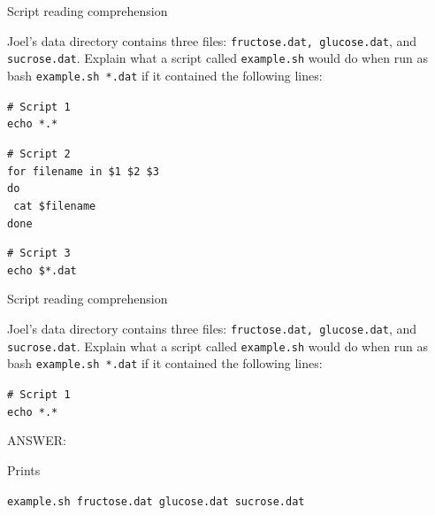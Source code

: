 \documentclass{beamer}
\begin{document}
\begin{frame}{Script reading comprehension}

Joel's data directory contains three files: \texttt{fructose.dat, glucose.dat}, and \texttt{sucrose.dat}. Explain what a script called \texttt{example.sh} would do when run as bash \texttt{example.sh *.dat} if it contained the following lines:
\vspace{0.5cm}


\begin{beamerboxesrounded}[upper=uppercolgreen,lower=lowercolgreen,shadow=false]{}
\small{\texttt{\# Script 1\\
echo *.*}}
\end{beamerboxesrounded}

\begin{beamerboxesrounded}[upper=uppercolgreen,lower=lowercolgreen,shadow=false]{}
\small{\texttt{\# Script 2\\
for filename in \$1 \$2 \$3\\
do\\}
\texttt{         cat \$filename\\}
\texttt{done\\}}
\end{beamerboxesrounded}

\begin{beamerboxesrounded}[upper=uppercolgreen,lower=lowercolgreen,shadow=false]{}
\small{\texttt{\# Script 3\\
echo \$*.dat}}
\end{beamerboxesrounded}


\end{frame}


\begin{frame}{Script reading comprehension}

Joel's data directory contains three files: \texttt{fructose.dat, glucose.dat}, and \texttt{sucrose.dat}. Explain what a script called \texttt{example.sh} would do when run as bash \texttt{example.sh *.dat} if it contained the following lines:
\vspace{0.5cm}


\begin{beamerboxesrounded}[upper=uppercolgreen,lower=lowercolgreen,shadow=false]{}
\small{\texttt{\# Script 1\\
echo *.*}}
\end{beamerboxesrounded}

\alert{ANSWER:}

Prints

\texttt{example.sh fructose.dat   glucose.dat    sucrose.dat}

\end{frame}
\end{document}
